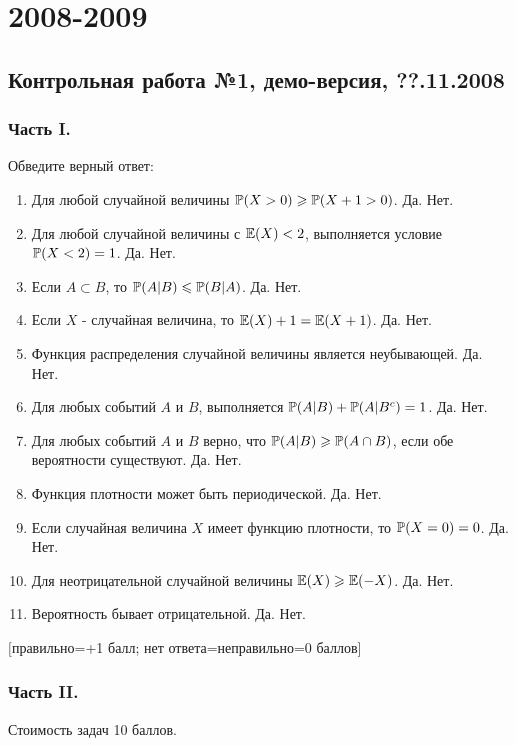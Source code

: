 \documentclass[12pt, a4paper]{article}\usepackage[]{graphicx}\usepackage[]{color}
\begin{document}
\section{2008-2009}

\subsection{Контрольная работа №1, демо-версия, ??.11.2008}

\subsubsection*{Часть I.}

Обведите верный ответ:

\begin{enumerate}
\item Для любой случайной величины $\P(X>0)\ge \P(X+1>0)$. Да. Нет.
\item Для любой случайной величины с $\E(X)<2$, выполняется условие $\P(X<2)=1$. Да. Нет.
\item Если $A\subset B$, то $\P(A|B)\le \P(B|A)$. Да. Нет.
\item Если  $X$  - случайная величина, то $\E(X)+1=\E(X+1)$. Да. Нет.
\item Функция распределения случайной величины является неубывающей. Да. Нет.
\item Для любых событий $A$ и $B$, выполняется $\P(A|B)+\P(A|B^{c})=1$. Да. Нет.
\item Для любых событий  $A$  и  $B$  верно, что $\P(A|B)\ge \P(A\cap
B)$, если обе вероятности существуют. Да. Нет.
\item Функция плотности может быть периодической. Да. Нет.
\item Если случайная величина $X$ имеет функцию плотности, то $\P(X=0)=0$. Да. Нет.
\item Для неотрицательной случайной величины $\E(X)\ge \E(-X)$. Да.
Нет.
\item Вероятность бывает отрицательной. Да. Нет.
\end{enumerate}
$[$правильно=+1 балл; нет ответа=неправильно=0 баллов$]$

\subsubsection*{Часть II.}

Стоимость задач 10 баллов.
\end{document}

